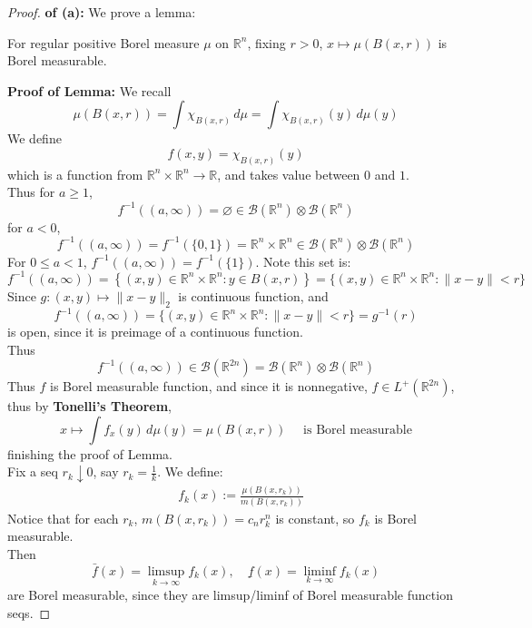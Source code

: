 \documentclass[lang=cn,11pt]{elegantbook}
\begin{document}
\begin{proof}
    \textbf{of (a):}
We prove a lemma:    
\begin{lemma}
For regular positive Borel measure $\mu$ on $\mathbb{R}^n$, fixing $r >0$, $x \mapsto \mu(B(x,r))$ is Borel measurable.\end{lemma}
\textbf{Proof of Lemma: }We recall \[
 \mu(B(x,r)) = \int \chi_{B(x,r)}  \, d\mu  = \int \chi_{B(x,r)}(y)  \, d\mu (y)
\]
We define \[
f(x,y) =  \chi_{B(x,r)}(y)
\]
which is a function from $\mathbb{R}^n \times \mathbb{R}^n \to \mathbb{R}$, and takes value between $0$ and $1$.\\
Thus for $a \geq 1$, \[
f^{-1}((a,\infty)) = \varnothing  \in \mathcal{B}(\mathbb{R}^{n})\otimes \mathcal{B}(\mathbb{R}^{n})
 \]
 for $a <  0$, \[
 f^{-1}((a,\infty)) =  f^{-1} (\{ 0,1\})  = \mathbb{R}^n \times \mathbb{R}^n  \in   \mathcal{B}(\mathbb{R}^{n})\otimes \mathcal{B}(\mathbb{R}^{n})
 \]
For $0 \leq a < 1$, $ f^{-1}((a,\infty)) = f^{-1} (\{ 1\})$. Note this set is: \[
f^{-1}((a,\infty)) = \left\{(x, y) \in \mathbb{R}^n \times \mathbb{R}^n: y \in B(x, r)\right\}=\{(x, y)\in \mathbb{R}^n \times \mathbb{R}^n:\|x-y\|<r\}
\]
Since $g: (x,y) \mapsto \|x-y\|_2$ is continuous function, and \[
f^{-1}((a,\infty)) = \{(x, y)\in \mathbb{R}^n \times \mathbb{R}^n:\|x-y\|<r\} = g^{-1} (r)
\]
is open, since it is preimage of a continuous function.\\
Thus \[
f^{-1}((a,\infty)) \in \mathcal{B}(\mathbb{R}^{2n}) = \mathcal{B}(\mathbb{R}^{n})\otimes \mathcal{B}(\mathbb{R}^{n})
\]
Thus $f$ is Borel measurable function, and since it is nonnegative, $f \in L^+(\mathbb{R}^{2n})$, thus by \textbf{Tonelli's Theorem}, \[
x \mapsto \int  f_x(y)\, d\mu(y) =  \mu(B(x,r)) \quad \text{ is Borel measurable}
\]finishing the proof of Lemma.\\
Fix a seq $r_k \downarrow 0 $, say $r_k=\frac{1}{k} $. We define:
\begin{align*}
&f_k(x):=\frac{\mu(B\left(x, r_k\right))}{m(B\left(x, r_k\right))}
\end{align*}
Notice that for each $r_k$, $ m(B(x, r_k))=c_n r_k^n$ is constant, so $f_k$ is Borel measurable.\\
Then$$
\bar{f}(x)=\limsup _{k \rightarrow \infty} f_k(x), \quad \underline{f}(x)=\liminf _{k \rightarrow \infty} f_k(x)
$$are Borel measurable, since they are limsup/liminf of Borel measurable function seqs.
\end{proof}
\end{document}
